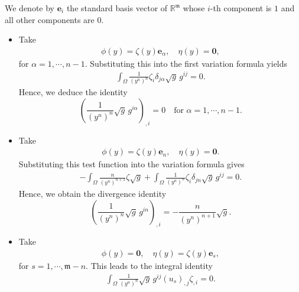 \documentclass[11pt,reqno]{amsart}
\newcommand{\fm}{\mathfrak{m}}
\theoremstyle{definition}
\numberwithin{equation}{section}
\begin{document}
We denote by $\mathbf{e}_i$ the standard basis vector of $\mathbb{R}^\fm$ whose $i$-th component is $1$ and all other components are $0$.
\begin{itemize}
    \item Take 
    \begin{align}
        \phi(y)=\zeta(y) \mathbf{e}_\alpha,\quad \eta(y)=\mathbf{0},
    \end{align}
    for $\alpha=1,\cdots,n-1$. Substituting this into the first variation formula yields
    \begin{align}
    \int_\Omega \frac{1}{(y^n)^n}\zeta_i\delta_{j\alpha}\sqrt{g}\,g^{ij}=0.    
    \end{align}
    Hence, we deduce the identity
    \begin{equation}\label{choose-phi-alpha}
    \left(\frac{1}{(y^n)^n}\sqrt{g}\,g^{i\alpha}\right)_{,i}=0\quad\text{for }  \alpha=1,\cdots,n-1.
    \end{equation}

    \item Take
    \begin{align}
        \phi(y)=\zeta(y)\mathbf{e}_n,\quad \eta(y)=\mathbf{0}.
    \end{align}
    Substituting this test function into the variation formula gives
    \begin{align}
       -\int_\Omega \frac{n}{(y^n)^{n+1}}\zeta\sqrt{g}+\int_\Omega \frac{1}{(y^n)^n}\zeta_i\delta_{jn}\sqrt{g}\,g^{ij}=0. 
    \end{align}
    Hence, we obtain the divergence identity
    \begin{equation}\label{choose-phi-n}
    \left(\frac{1}{(y^n)^n}\sqrt{g}\,g^{in}\right)_{,i}=-\frac{n}{(y^n)^{n+1}}\sqrt{g}.
    \end{equation}

    \item Take 
    \begin{align}
        \phi(y)=\mathbf{0},\quad \eta(y)=\zeta(y) \mathbf{e}_s,
    \end{align}
    for $s=1,\cdots,\fm-n$. This leads to the integral identity
    \begin{align}\label{eq-choose-phi-0}
        \int_\Omega \frac{1}{(y^n)^n}\sqrt{g}\,g^{ij}(u_s)_{,j}\zeta_{,i}=0.
    \end{align}
\end{itemize}
\end{document}
